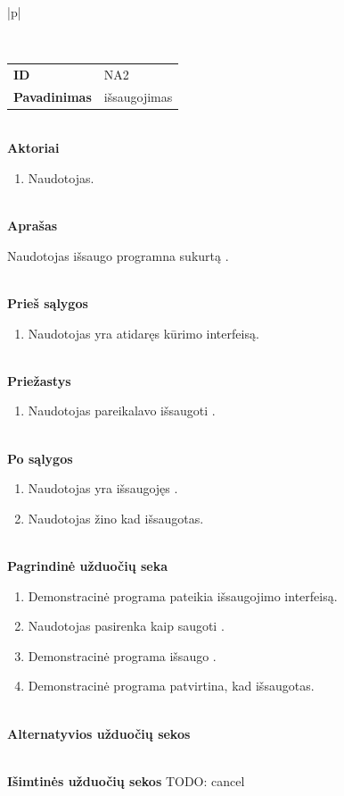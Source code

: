 \begin{center}
    \begin{longtable}{|p{\textwidth}|}
    \caption{\DVCM{} saugojimo naudojimo atvejis}
	\label{tab:program_re_dvcm_save}
	\\ \hline
    \begin{tabular}{@{}p{3.5cm}p{12cm}}
    	\\
    	\textbf{ID} & NA2
    	\\
    	\textbf{Pavadinimas} & \DVCM{} išsaugojimas
    	\\
    \end{tabular}
    \\
    \textbf{Aktoriai}
    \begin{enumerate}
    	\item Naudotojas.
	\end{enumerate}
    \\
    \textbf{Aprašas}

      Naudotojas išsaugo programna sukurtą \DVCM{}.

    \\
    \textbf{Prieš sąlygos}
    \begin{enumerate}
    	\item Naudotojas yra atidaręs \DVCM{} kūrimo interfeisą.
	\end{enumerate}
    \\
    \textbf{Priežastys}
    \begin{enumerate}
    	\item Naudotojas pareikalavo išsaugoti \DVCM{}.
	\end{enumerate}
    \\
    \textbf{Po sąlygos}
    \begin{enumerate}
    	\item Naudotojas yra išsaugojęs \DVCM{}.
      \item Naudotojas žino kad \DVCM{} išsaugotas.
	\end{enumerate}
    \\
    \textbf{Pagrindinė užduočių seka}
    \begin{enumerate}
    	\item Demonstracinė programa pateikia išsaugojimo interfeisą.
    	\item Naudotojas pasirenka kaip saugoti \DVCM{}.
      \item Demonstracinė programa išsaugo \DVCM{}.
      \item Demonstracinė programa patvirtina, kad \DVCM{} išsaugotas.
	\end{enumerate}
    \\
    \textbf{Alternatyvios užduočių sekos}

    \\
    \textbf{Išimtinės užduočių sekos}
      TODO: cancel
    \\
    \\ \hline
    \end{longtable}
\end{center}

